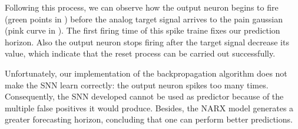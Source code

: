Following this process, we can observe how the output neuron begins to fire (green points in ) before the analog target signal arrives to the pain gaussian (pink curve in ). 
The first firing time of this spike traine fixes our prediction horizon. 
Also the output neuron stops firing after the target signal decrease its value, which indicate that the reset process can be carried out successfully.

Unfortunately, our implementation of the backpropagation algorithm does not make the SNN learn correctly: 
the output neuron spikes too many times. 
Consequently, the SNN developed cannot be used as predictor because of the multiple false positives it would produce. 
Besides, the NARX model generates a greater forecasting horizon, concluding that one can perform better predictions.
